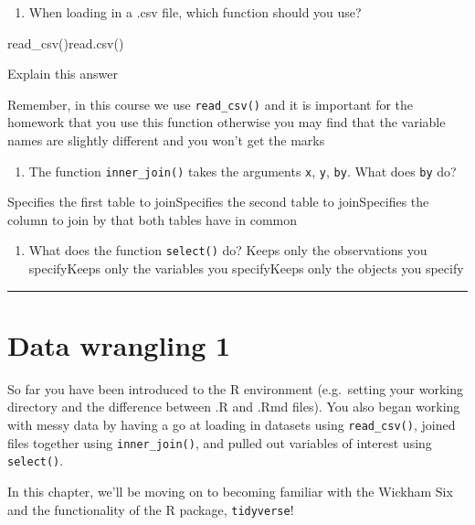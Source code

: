 \documentclass[
  oneside]{book}
\providecommand{\tightlist}{%
  \setlength{\itemsep}{0pt}\setlength{\parskip}{0pt}}
\begin{document}
\begin{enumerate}
\def\labelenumi{\arabic{enumi}.}
\tightlist
\item
  When loading in a .csv file, which function should you use?
\end{enumerate}

read\_csv()read.csv()

Explain this answer

Remember, in this course we use \texttt{read\_csv()} and it is important for the homework that you use this function otherwise you may find that the variable names are slightly different and you won't get the marks

\begin{enumerate}
\def\labelenumi{\arabic{enumi}.}
\setcounter{enumi}{1}
\tightlist
\item
  The function \texttt{inner\_join()} takes the arguments \texttt{x}, \texttt{y}, \texttt{by}. What does \texttt{by} do?
\end{enumerate}

Specifies the first table to joinSpecifies the second table to joinSpecifies the column to join by that both tables have in common

\begin{enumerate}
\def\labelenumi{\arabic{enumi}.}
\setcounter{enumi}{2}
\tightlist
\item
  What does the function \texttt{select()} do?
  Keeps only the observations you specifyKeeps only the variables you specifyKeeps only the objects you specify
\end{enumerate}

\begin{center}\rule{0.5\linewidth}{0.5pt}\end{center}

\hypertarget{data-wrangling-1}{%
\chapter{Data wrangling 1}\label{data-wrangling-1}}

\begin{info}
So far you have been introduced to the R environment (e.g.~setting your
working directory and the difference between .R and .Rmd files). You
also began working with messy data by having a go at loading in datasets
using \texttt{read\_csv()}, joined files together using
\texttt{inner\_join()}, and pulled out variables of interest using
\texttt{select()}.

In this chapter, we'll be moving on to becoming familiar with the
Wickham Six and the functionality of the R package, \texttt{tidyverse}!
\end{info}
\end{document}
